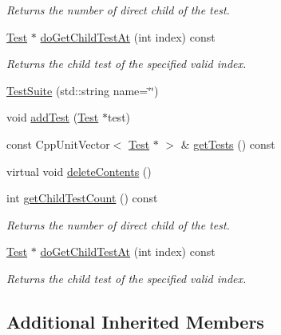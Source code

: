 \begin{DoxyCompactItemize}
\begin{DoxyCompactList}\small\item\em Returns the number of direct child of the test. \end{DoxyCompactList}\item 
\hyperlink{class_test}{Test} $\ast$ \hyperlink{class_test_suite_a5fcd9a9720fb6ad14f46f31d6a7ce906}{do\+Get\+Child\+Test\+At} (int index) const 
\begin{DoxyCompactList}\small\item\em Returns the child test of the specified valid index. \end{DoxyCompactList}\item 
\hyperlink{class_test_suite_aedef358022b725810f2f145ac078c01b}{Test\+Suite} (std\+::string name=\char`\"{}\char`\"{})
\item 
void \hyperlink{class_test_suite_a8cd9628eee382a9670076765ec25cfa8}{add\+Test} (\hyperlink{class_test}{Test} $\ast$test)
\item 
const Cpp\+Unit\+Vector$<$ \hyperlink{class_test}{Test} $\ast$ $>$ \& \hyperlink{class_test_suite_ad2bd3e20523bb357b7a4608a7978ea49}{get\+Tests} () const 
\item 
virtual void \hyperlink{class_test_suite_ac968917f934d102227abd8b2130e67f9}{delete\+Contents} ()
\item 
\hypertarget{class_test_suite_aeaabfd3afef12412cd390b90128a7d87}{int \hyperlink{class_test_suite_aeaabfd3afef12412cd390b90128a7d87}{get\+Child\+Test\+Count} () const }\label{class_test_suite_aeaabfd3afef12412cd390b90128a7d87}

\begin{DoxyCompactList}\small\item\em Returns the number of direct child of the test. \end{DoxyCompactList}\item 
\hyperlink{class_test}{Test} $\ast$ \hyperlink{class_test_suite_aab4d1f64d7b32a24489cc2a3f3e412ee}{do\+Get\+Child\+Test\+At} (int index) const 
\begin{DoxyCompactList}\small\item\em Returns the child test of the specified valid index. \end{DoxyCompactList}\end{DoxyCompactItemize}
\subsection*{Additional Inherited Members}


